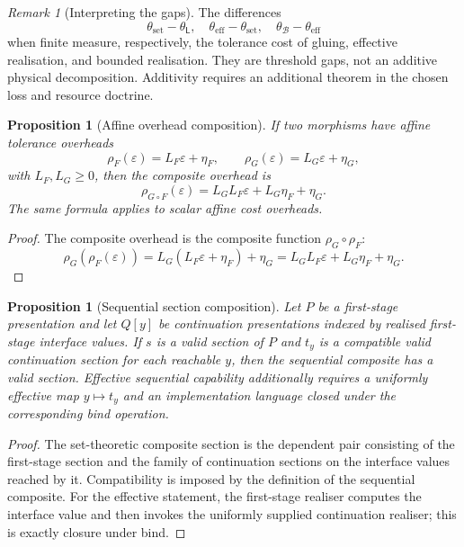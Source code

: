 \documentclass[11pt]{article}
\theoremstyle{plain}
\newtheorem{proposition}[theorem]{Proposition}
\theoremstyle{definition}
\theoremstyle{remark}
\newtheorem{remark}[theorem]{Remark}
\newcommand{\eps}{\varepsilon}
\begin{document}
\begin{remark}[Interpreting the gaps]
The differences
\[
\theta_{\mathrm{set}}-\theta_{\mathsf L},\quad
\theta_{\mathrm{eff}}-\theta_{\mathrm{set}},\quad
\theta_{\mathcal B}-\theta_{\mathrm{eff}}
\]
when finite measure, respectively, the tolerance cost of gluing, effective
realisation, and bounded realisation. They are threshold gaps, not an additive
physical decomposition. Additivity requires an additional theorem in the chosen
loss and resource doctrine.
\end{remark}

\begin{proposition}[Affine overhead composition]
\label{prop:affine-overhead-composition}
If two morphisms have affine tolerance overheads
\[
\rho_F(\eps)=L_F\eps+\eta_F,
\qquad
\rho_G(\eps)=L_G\eps+\eta_G,
\]
with $L_F,L_G\ge0$, then the composite overhead is
\[
\rho_{G\circ F}(\eps)=L_GL_F\eps+L_G\eta_F+\eta_G.
\]
The same formula applies to scalar affine cost overheads.
\end{proposition}

\begin{proof}
The composite overhead is the composite function
$\rho_G\circ\rho_F$:
\[
\rho_G(\rho_F(\eps))=L_G(L_F\eps+\eta_F)+\eta_G
=L_GL_F\eps+L_G\eta_F+\eta_G.
\]
\end{proof}

\begin{proposition}[Sequential section composition]
\label{prop:sequential-composition-monograph}
Let $P$ be a first-stage presentation and let $Q[y]$ be continuation
presentations indexed by realised first-stage interface values. If $s$ is a valid
section of $P$ and $t_y$ is a compatible valid continuation section for each
reachable $y$, then the sequential composite has a valid section. Effective
sequential capability additionally requires a uniformly effective map
$y\mapsto t_y$ and an implementation language closed under the corresponding
bind operation.
\end{proposition}

\begin{proof}
The set-theoretic composite section is the dependent pair consisting of the
first-stage section and the family of continuation sections on the interface
values reached by it. Compatibility is imposed by the definition of the
sequential composite. For the effective statement, the first-stage realiser
computes the interface value and then invokes the uniformly supplied continuation
realiser; this is exactly closure under bind.
\end{proof}
\end{document}
